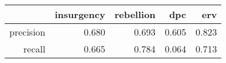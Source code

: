 \begin{tabular}{rrrrr}
  \hline
 & insurgency & rebellion & dpc & erv \\ 
  \hline
precision & 0.680 & 0.693 & 0.605 & 0.823 \\ 
  recall & 0.665 & 0.784 & 0.064 & 0.713 \\ 
   \hline
\end{tabular}
